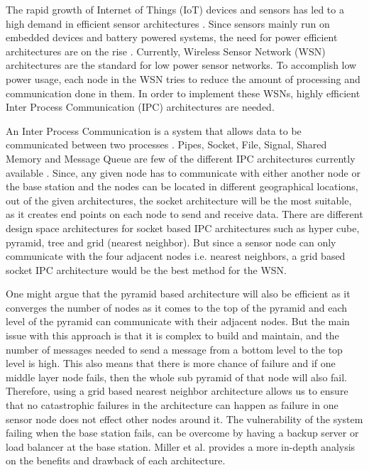 \documentclass[conference]{IEEEtran}
\begin{document}
	The rapid growth of Internet of Things (IoT) devices and sensors has led to a high demand in efficient sensor architectures \cite{othman2012wireless}. Since sensors mainly run on embedded devices and battery powered systems, the need for power efficient architectures are on the rise \cite{guy2006wireless}. Currently, Wireless Sensor Network (WSN) architectures are the standard for low power sensor networks. To accomplish low power usage, each node in the WSN tries to reduce the amount of processing and communication done in them. In order to implement these WSNs, highly efficient Inter Process Communication (IPC) architectures are needed.
	
	An Inter Process Communication is a system that allows data to be communicated between two processes \cite{techopedia.com}. Pipes, Socket, File, Signal, Shared Memory and Message Queue are few of the different IPC architectures currently available \cite{onsman_2018}. Since, any given node has to communicate with either another node or the base station and the nodes can be located in different geographical locations, out of the given architectures, the socket architecture will be the most suitable, as it creates end points on each node to send and receive data. There are different design space architectures for socket based IPC architectures such as hyper cube, pyramid, tree and grid (nearest neighbor). But since a sensor node can only communicate with the four adjacent nodes i.e. nearest neighbors, a grid based socket IPC architecture would be the best method for the WSN. 
	
	One might argue that the pyramid based architecture will also be efficient as it converges the number of nodes as it comes to the top of the pyramid and each level of the pyramid can communicate with their adjacent nodes. But the main issue with this approach is that it is complex to build and maintain, and the number of messages needed to send a message from a bottom level to the top level is high. This also means that there is more chance of failure and if one middle layer node fails, then the whole sub pyramid of that node will also fail. Therefore, using a grid based nearest neighbor architecture allows us to ensure that no catastrophic failures in the architecture can happen as failure in one sensor node does not effect other nodes around it. The vulnerability of the system failing  when the base station fails, can be overcome by having a backup server or load balancer at the base station. Miller et al. \cite{miller1996parallel} provides a more in-depth analysis on the benefits and drawback of each architecture.
	
\end{document}
